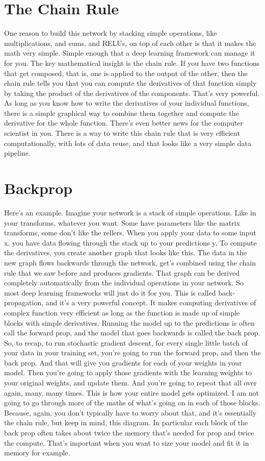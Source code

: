 \documentclass{article}
\begin{document}
\section{The Chain Rule}
One reason to build this network
by stacking simple operations,
like multiplications, and sums,
and RELUs, on top of each other is
that it makes the math very simple.
Simple enough that a deep learning
framework can manage it for you.
The key mathematical
insight is the chain rule.
If you have two functions
that get composed, that is,
one is applied to
the output of the other,
then the chain rule tells you that you
can compute the derivatives of that
function simply by taking the product
of the derivatives of the components.
That's very powerful.
As long as you know how to write
the derivatives of your individual
functions, there is a simple graphical
way to combine them together and
compute the derivative for
the whole function.
There's even better news for
the computer scientist in you.
There is a way to write this chain rule
that is very efficient computationally,
with lots of data reuse, and that looks
like a very simple data pipeline.
\section{Backprop}
Here's an example.
Imagine your network is
a stack of simple operations.
Like in your transforms,
whatever you want.
Some have parameters like the matrix
transforms, some don't like the rellers.
When you apply your
data to some input x,
you have data flowing through
the stack up to your predictions y.
To compute the derivatives, you create
another graph that looks like this.
The data in the new graph flows
backwards through the network,
get's combined using the chain rule that
we saw before and produces gradients.
That graph can be derived completely
automatically from the individual
operations in your network.
So most deep learning frameworks
will just do it for you.
This is called back-propagation,
and it's a very powerful concept.
It makes computing derivatives of
complex function very efficient
as long as the function is made up of
simple blocks with simple derivatives.
Running the model up to the predictions
is often call the forward prop, and
the model that goes backwards
is called the back prop.
So, to recap,
to run stochastic gradient descent,
for every single little batch of
your data in your training set,
you're going to run the forward prop,
and then the back prop.
And that will give you gradients for
each of your weights in your model.
Then you're going to apply those
gradients with the learning weights
to your original weights,
and update them.
And you're going to repeat that
all over again, many, many times.
This is how your entire
model gets optimized.
I am not going to go through more
of the maths of what's going on in
each of those blocks.
Because, again, you don't typically
have to worry about that, and
it's essentially the chain rule,
but keep in mind, this diagram.
In particular each block of
the back prop often takes about
twice the memory that's needed for
prop and twice the compute.
That's important when you
want to size your model and
fit it in memory for example.
\end{document}
